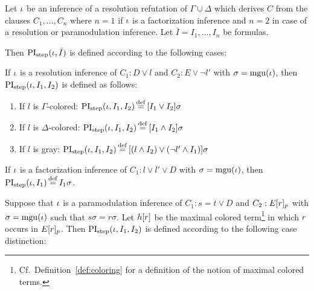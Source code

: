\begin{defi}[$\PIstep$]
	Let $\iota$ be an inference of a resolution refutation of $\Gamma\cup\Delta$ which derives $C$ from the clauses $C_1, \dots, C_n$ where $n=1$ if $\iota$ is a factorization inference and $n=2$ in case of a resolution or paramodulation inference. 
	Let $\bar I = I_1, \dots, I_n$ be formulas.

	Then $\operatorname{PI}_{\mathrm{step}}(\iota, \bar I)$ is defined according to the following cases:

	\begin{indproof}
		\label{def:PI_resolution}
			If $\iota$ is a resolution inference of $C_1: D \lor l$ and $C_2: E \lor \lnot l'$ with $\sigma = \operatorname{mgu}(\iota)$, then $\operatorname{PI}_{\mathrm{step}}(\iota, I_1, I_2)$ is defined as follows:
			\begin{enumerate}
				\item If $l$ is $\Gamma$-colored: 
					$\PIstep(\inference, I_1, I_2) \defeq{} [I_1 \lor I_2]\sigma$
				\item If $l$ is $\Delta$-colored: 
					$\PIstep(\inference, I_1, I_2) \defeq{} [I_1 \land I_2]\sigma$
				\item If $l$ is gray: 
					$\PIstep(\inference, I_1, I_2) \defeq{} [(l \land I_2) \lor (\lnot l' \land I_1) ]\sigma $
			\end{enumerate}

			If $\iota$ is a factorization inference of $C_1: l \lor l' \lor D$ with $\sigma = \operatorname{mgu}(\iota)$,
			then $\PIstep(\inference, I_1) \defeq I_1\sigma$.

			\label{def:PI_paramod}
			Suppose that $\iota$ is a paramodulation inference of $C_1: s=t \lor D$ and $C_2: E{[r]_{p}}$ 
			with $\sigma = \operatorname{mgu}(\iota)$ such that $s\sigma = r\sigma$.
			Let $h[r]$ be the maximal colored term\footnote{Cf.\ Definition~\ref{def:coloring} for a definition of the notion of maximal colored terms.} in which $r$ occurs in $E{[r]_{p}}$.
			Then $\operatorname{PI}_{\mathrm{step}}(\iota, I_1, I_2)$ is defined according to the following case distinction:


\end{indproof}
\end{defi}
